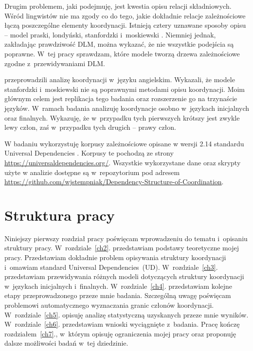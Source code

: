 Drugim problemem, jaki podejmuję, jest kwestia opisu relacji składniowych. Wśród lingwistów nie ma zgody co do tego, jakie dokładnie relacje zależnościowe łączą poszczególne elementy koordynacji. Istnieją cztery uznawane sposoby opisu -- model praski, londyński, stanfordzki i~moskiewski \citep{popel2013coordination, przepiorkowski2023conjunct}. Niemniej jednak, zakładając prawdziwość DLM, można wykazać, że nie wszystkie podejścia są poprawne. W~tej pracy sprawdzam, które modele tworzą drzewa zależnościowe zgodne z~przewidywaniami DLM.

\cite{przepiorkowski2023conjunct} przeprowadzili analizę koordynacji w~języku angielskim. Wykazali, że modele stanfordzki i~moskiewski nie są poprawnymi metodami opisu koordynacji. Moim głównym celem jest replikacja tego badania oraz rozszerzenie go na trzynaście języków. W~ramach badania analizuję koordynacje osobno w~językach inicjalnych oraz finalnych. Wykazuję, że w~przypadku tych pierwszych krótszy jest zwykle lewy człon, zaś w~przypadku tych drugich -- prawy człon.


W badaniu wykorzystuję korpusy zależnościowe opisane w wersji 2.14 standardu Universal Dependencies \citep{de2021universal}. Korpusy te pochodzą ze strony \url{https://universaldependencies.org/}. 
Wszystkie wykorzystane dane oraz skrypty użyte w analizie dostępne są w~repozytorium pod adresem \url{https://github.com/wjstempniak/Dependency-Structure-of-Coordination}.

\section{Struktura pracy}

Niniejszy pierwszy rozdział pracy poświęcam wprowadzeniu do tematu i~opisaniu struktury pracy. W~rozdziale~\ref{ch2}. przedstawiam podstawy teoretyczne mojej pracy. Przedstawiam dokładnie problem opisywania struktury koordynacji i~omawiam standard Universal Dependencies~(UD). W~rozdziale~\ref{ch3}. przedstawiam przewidywania różnych modeli dotyczących struktury koordynacji w~językach inicjalnych i~finalnych. W~rozdziale~\ref{ch4}. przedstawiam kolejne etapy przeprowadzonego przeze mnie badania. Szczególną uwagę poświęcam problemowi automatycznego wyznaczania granic członów koordynacji. W~rozdziale~\ref{ch5}. opisuję analizę statystyczną uzyskanych przeze mnie wyników. W~rozdziale~\ref{ch6}. przedstawiam wnioski wyciągnięte z~badania. Pracę kończę rozdziałem~\ref{ch7}., w~którym opisuję ograniczenia mojej pracy oraz proponuję dalsze możliwości badań w~tej dziedzinie.
